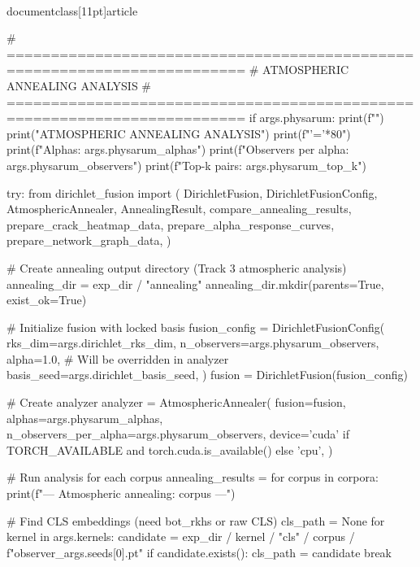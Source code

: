 \\documentclass[11pt]{article}
\begin{document}
\begin{CodeBlock}
    # =========================================================================
    # ATMOSPHERIC ANNEALING ANALYSIS
    # =========================================================================
    if args.physarum:
        print(f"")
        print("ATMOSPHERIC ANNEALING ANALYSIS")
        print(f"{'='*80}")
        print(f"Alphas: {args.physarum_alphas}")
        print(f"Observers per alpha: {args.physarum_observers}")
        print(f"Top-k pairs: {args.physarum_top_k}")
        
        try:
            from dirichlet_fusion import (
                DirichletFusion, DirichletFusionConfig,
                AtmosphericAnnealer, AnnealingResult,
                compare_annealing_results,
                prepare_crack_heatmap_data,
                prepare_alpha_response_curves,
                prepare_network_graph_data,
            )

            # Create annealing output directory (Track 3 atmospheric analysis)
            annealing_dir = exp_dir / "annealing"
            annealing_dir.mkdir(parents=True, exist_ok=True)

            # Initialize fusion with locked basis
            fusion_config = DirichletFusionConfig(
                rks_dim=args.dirichlet_rks_dim,
                n_observers=args.physarum_observers,
                alpha=1.0,  # Will be overridden in analyzer
                basis_seed=args.dirichlet_basis_seed,
            )
            fusion = DirichletFusion(fusion_config)

            # Create analyzer
            analyzer = AtmosphericAnnealer(
                fusion=fusion,
                alphas=args.physarum_alphas,
                n_observers_per_alpha=args.physarum_observers,
                device='cuda' if TORCH_AVAILABLE and torch.cuda.is_available() else 'cpu',
            )
            
            # Run analysis for each corpus
            annealing_results = {}
            for corpus in corpora:
                print(f"\n--- Atmospheric annealing: {corpus} ---")
                
                # Find CLS embeddings (need bot_rkhs or raw CLS)
                cls_path = None
                for kernel in args.kernels:
                    candidate = exp_dir / kernel / "cls" / corpus / f"observer_{args.seeds[0]}.pt"
                    if candidate.exists():
                        cls_path = candidate
                        break
                

\end{CodeBlock}
\end{document}
